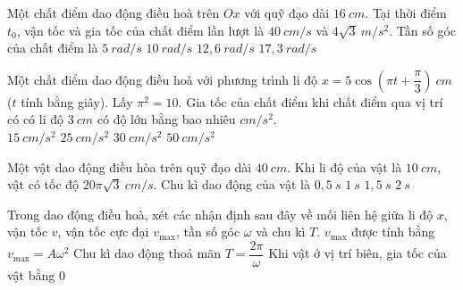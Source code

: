 \begin{ex}
Một chất điểm dao động điều hoà trên $O x$ với quỹ đạo dài $16 \ cm$. Tại thời điểm $t_0$, vận tốc và gia tốc của chất điểm lần lượt là $40 \ cm/s$ và $4 \sqrt{3} \ m/s^2$. Tần số góc của chất điểm là
\choice
{$5\ rad/s$}
{\True $10\ rad/s$}
{$12,6\ rad/s$}
{$17,3\ rad/s$}
\end{ex}
\begin{ex}
Một chất điểm dao động điều hoà với phương trình li độ $x=5 \cos (\pi t+\dfrac{\pi}{3})\ cm$ ($t$ tính bằng giây). Lấy $\pi^2=10$. Gia tốc của chất điểm khi chất điểm qua vị trí có có li độ $3 \ cm$ có độ lớn bằng bao nhiêu $cm/s^2$.\\
\choice
{$15\ cm/s^2$}
{$25\ cm/s^2$}
{\True $30\ cm/s^2$}
{$50\ cm/s^2$}
\end{ex}

\begin{ex}
Một vật dao động điều hòa trên quỹ đạo dài $40\ cm$. Khi li độ của vật là $10\ cm$, vật có tốc độ $20\pi\sqrt{3}\ cm/s$. Chu kì dao động của vật là
\choice
{$0,5\ s$}
{\True $1\ s$}
{$1,5\ s$}
{$2\ s$}
\end{ex}
\setcounter{ex}{0}
\PhanII
\begin{ex}
Trong dao động điều hoà, xét các nhận định sau đây về mối liên hệ giữa li độ $x$, vận tốc $v$, vận tốc cực đại $v_{\max}$, tần số góc $\omega$ và chu kì $T$.
{$v_{\max}$ được tính bằng $v_{\max}=A\omega^{2}$}
{\True Chu kì dao động thoả mãn $T = \dfrac{2\pi}{\omega}$}
{Khi vật ở vị trí biên, gia tốc của vật bằng $0$}
\loigiai{
\begin{itemchoice}
\itemch
\itemch
\itemch
\itemch
\end{itemchoice}
}
\end{ex}

